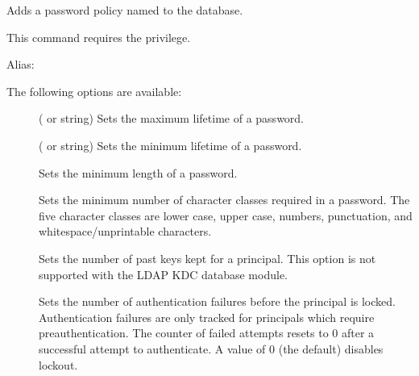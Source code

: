 \documentclass[letterpaper,10pt,english]{sphinxmanual}
\begin{document}
\sphinxAtStartPar
Adds a password policy named  to the database.

\sphinxAtStartPar
This command requires the  privilege.

\sphinxAtStartPar
Alias: 

\sphinxAtStartPar
The following options are available:
\begin{description}
\item[{ }] \leavevmode
\sphinxAtStartPar
( or  string) Sets the maximum
lifetime of a password.

\item[{ }] \leavevmode
\sphinxAtStartPar
( or  string) Sets the minimum
lifetime of a password.

\item[{ }] \leavevmode
\sphinxAtStartPar
Sets the minimum length of a password.

\item[{ }] \leavevmode
\sphinxAtStartPar
Sets the minimum number of character classes required in a
password.  The five character classes are lower case, upper case,
numbers, punctuation, and whitespace/unprintable characters.

\item[{ }] \leavevmode
\sphinxAtStartPar
Sets the number of past keys kept for a principal.  This option is
not supported with the LDAP KDC database module.

\end{description}
\label{\detokenize{admin/admin_commands/kadmin_local:policy-maxfailure}}\begin{description}
\item[{ }] \leavevmode
\sphinxAtStartPar
Sets the number of authentication failures before the principal is
locked.  Authentication failures are only tracked for principals
which require preauthentication.  The counter of failed attempts
resets to 0 after a successful attempt to authenticate.  A
 value of 0 (the default) disables lockout.

\end{description}
\end{document}
